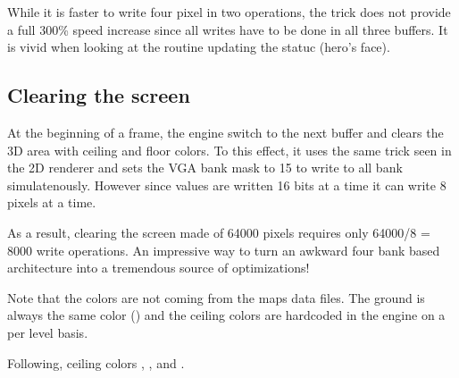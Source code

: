 While it is faster to write four pixel in two operations, the trick does not provide a full 300\% speed increase since all writes have to be done in all three buffers. It is vivid when looking at the routine updating the statuc (hero's face).\\
\par
\begin{minipage}{\textwidth}

\end{minipage}



\subsection{Clearing the screen}
At the beginning of a frame, the engine switch to the next buffer and clears the 3D area with ceiling and floor colors. To this effect, it uses the same trick seen in the 2D renderer and sets the VGA bank mask to 15 to write to all bank simulatenously. However since values are written 16 bits at a time it can write 8 pixels at a time.\\ 
\par
\begin{minipage}{\textwidth}
 
 \end{minipage}
\par
As a result, clearing the screen made of 64000 pixels requires only 64000/8 = 8000 write operations. An impressive way to turn an awkward four bank based architecture into a tremendous source of optimizations!\\
\par
Note that the colors are not coming from the maps data files. The ground is always the same color () and the ceiling colors are hardcoded in the engine on a per level basis.\\
\par
\begin{minipage}{\textwidth}
 
 \end{minipage}
\par


Following, ceiling colors , ,  and .\\ 
\par
{}







